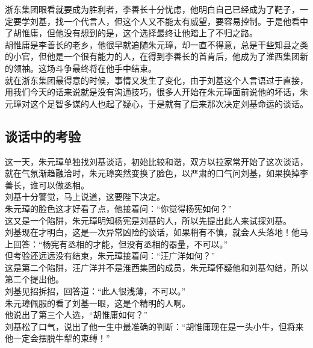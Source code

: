 \begin{multicols}{\theparacolNo}
浙东集团眼看就要成为胜利者，李善长十分忧虑，他明白自己已经成为了靶子，一定要学刘基，找一个代言人，但这个人又不能太有威望，要容易控制。于是他看中了胡惟庸，但他没有想到的是，这个选择最终让他踏上了不归之路。\\

胡惟庸是李善长的老乡，他很早就追随朱元璋，却一直不得意，总是干些知县之类的小官，但他是一个很有能力的人，在得到李善长的首肯后，他成为了淮西集团新的领袖。这场斗争最终将在他手中结束。\\

就在浙东集团最得意的时候，事情又发生了变化，由于刘基这个人言语过于直接，用我们今天的话来说就是没有沟通技巧，很多人开始在朱元璋面前说他的坏话，朱元璋对这个足智多谋的人也起了疑心，于是就有了后来那次决定刘基命运的谈话。\\

\subsection{谈话中的考验}
这一天，朱元璋单独找刘基谈话，初始比较和谐，双方以拉家常开始了这次谈话，就在气氛渐趋融洽时，朱元璋突然变换了脸色，以严肃的口气问刘基，如果换掉李善长，谁可以做丞相。\\

刘基十分警觉，马上说道，这要陛下决定。\\

朱元璋的脸色这才好看了点，他接着问：“你觉得杨宪如何？”\\

这又是一个陷阱，朱元璋明知杨宪是刘基的人，所以先提出此人来试探刘基。\\

刘基现在才明白，这是一次异常凶险的谈话，如果稍有不慎，就会人头落地！他马上回答：“杨宪有丞相的才能，但没有丞相的器量，不可以。”\\

但考验还远远没有结束，朱元璋接着问：“汪广洋如何？”\\

这是第二个陷阱，汪广洋并不是淮西集团的成员，朱元璋怀疑他和刘基勾结，所以第二个提出他。\\

刘基见招拆招，回答道：“此人很浅薄，不可以。”\\

朱元璋佩服的看了刘基一眼，这是个精明的人啊。\\

他说出了第三个人选，“胡惟庸如何？”\\

刘基松了口气，说出了他一生中最准确的判断：“胡惟庸现在是一头小牛，但将来他一定会摆脱牛犁的束缚！”\\


\end{multicols}
